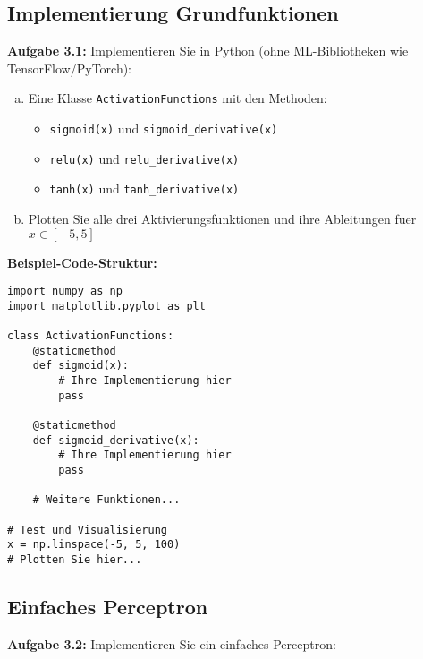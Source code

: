 ﻿\documentclass[12pt,a4paper]{article}
\begin{document}
\subsection{Implementierung Grundfunktionen}

\textbf{Aufgabe 3.1:} Implementieren Sie in Python (ohne ML-Bibliotheken wie TensorFlow/PyTorch):

\begin{enumerate}[(a)]
    \item Eine Klasse \texttt{ActivationFunctions} mit den Methoden:
    \begin{itemize}
        \item \texttt{sigmoid(x)} und \texttt{sigmoid\_derivative(x)}
        \item \texttt{relu(x)} und \texttt{relu\_derivative(x)}
        \item \texttt{tanh(x)} und \texttt{tanh\_derivative(x)}
    \end{itemize}
    
    \item Plotten Sie alle drei Aktivierungsfunktionen und ihre Ableitungen fuer $x \in [-5, 5]$
\end{enumerate}

\textbf{Beispiel-Code-Struktur:}
\begin{lstlisting}
import numpy as np
import matplotlib.pyplot as plt

class ActivationFunctions:
    @staticmethod
    def sigmoid(x):
        # Ihre Implementierung hier
        pass
    
    @staticmethod
    def sigmoid_derivative(x):
        # Ihre Implementierung hier
        pass
    
    # Weitere Funktionen...

# Test und Visualisierung
x = np.linspace(-5, 5, 100)
# Plotten Sie hier...
\end{lstlisting}

\subsection{Einfaches Perceptron}

\textbf{Aufgabe 3.2:} Implementieren Sie ein einfaches Perceptron:
\end{document}
